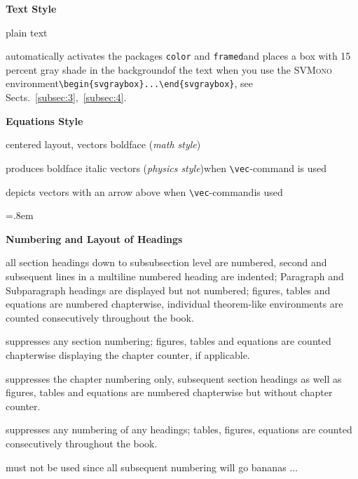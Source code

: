 \documentclass[graybox,square]{svmono}
\begin{document}
\begin{sloppy}
\bigskip\textbf{Text Style}

\begin{description}
\item[\textit{default}] plain text
\item[\textit{graybox}] automatically activates the packages \verb|color| and \verb|framed|\newline and places a box with 15 percent gray shade in the background\newline of the text when you use the \textsc{SVMono} environment\newline \verb|\begin{svgraybox}...\end{svgraybox}|, see Sects.~\ref{subsec:3},~\ref{subsec:4}.
\end{description}


\bigskip\textbf{Equations Style}

\begin{description}
\item[\textit{default}] centered layout, vectors boldface (\textit{math style})
\item[\textit{vecphys}] produces boldface italic vectors (\textit{physics style})\newline when \verb|\vec|-command is used
\item[\textit{vecarrow}] depicts vectors with an arrow above when \verb|\vec|-command\break is used
\end{description}

\parskip=.8em

\pagebreak

\textbf{Numbering and Layout of Headings}

\begin{description}
\item[\textit{default}] all section headings down to subsubsection level are numbered, second and subsequent lines in a multiline numbered heading are indented; Paragraph and Subparagraph headings are displayed but not numbered; figures, tables and equations are numbered chapterwise, individual theorem-like environments are counted consecutively throughout the book.
\item[\textit{nosecnum}] suppresses any section numbering; figures, tables and equations are counted chapterwise displaying the chapter counter, if applicable.
\item[{\it nochapnum}] suppresses the chapter numbering only, subsequent section headings as well as figures, tables and equations are numbered chapterwise but without chapter counter.
\item[{\it nonum}] suppresses any numbering of any headings; tables, figures, equations are counted consecutively throughout the book.
\item[{\tt $\backslash$chapter*}] must not be used since all subsequent numbering will go bananas $\ldots$
\end{description}


\end{sloppy}
\end{document}
